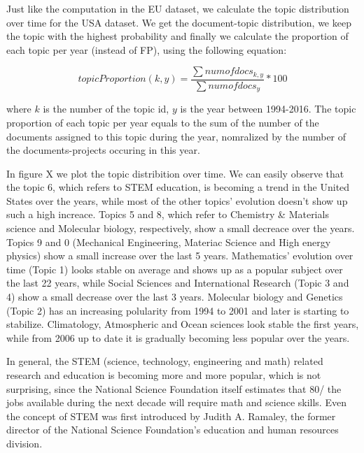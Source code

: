 \documentclass[12pt]{report}
\begin{document}
Just like the computation in the EU dataset, we calculate the topic 
distribution over time for the USA dataset. We get the document-topic 
distribution, we keep the topic with the highest probability and finally 
we calculate the proportion of each topic per
year (instead of FP), using the following equation:

\begin{equation}
topicProportion(k, y) = \frac{\sum num of docs_{k,y}}{\sum num of docs_{y}} * 100
\end{equation}

where $k$ is the number of the topic id, $y$ is the year between 1994-2016. The
topic proportion of each topic per year equals to the sum of the number of the
documents assigned to this topic during the year, nomralized by the number of
the documents-projects  occuring in this year.

In figure X we plot the topic distribition over time. We can easily observe that
the topic 6, which refers to STEM education, is becoming a trend in the United
States over the years, while most of the other topics' evolution doesn't show up
such a high increace. Topics 5 and 8, which refer to Chemistry \& Materials
science and Molecular biology, respectively, show a small decreace over the
years. Topics 9 and 0 (Mechanical Engineering, Materiac Science and High energy
physics) show a small increase over the last 5 years. Mathematics' evolution
over time (Topic 1) looks stable on average and shows up as a popular subject
over the last 22 years, while Social Sciences and International Research (Topic
3 and 4) show a small decrease over the last 3 years.  Molecular biology and
Genetics (Topic 2) has an increasing polularity from 1994 to 2001 and later is
starting to stabilize. Climatology, Atmospheric and Ocean sciences look stable
the first years, while from 2006 up to date it is gradually becoming less
popular over the years.

In general, the STEM (science, technology, engineering and math) related
research and education is becoming more and more popular, which is not
surprising, since the National Science Foundation itself estimates that 80/%
the jobs available during the next decade will require math and science skills.
Even the concept of STEM was first introduced by Judith A. Ramaley, the former
director of the National Science Foundation’s education and human resources
division.
\end{document}
